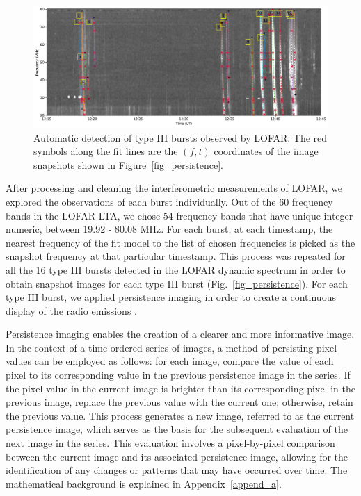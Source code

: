 \begin{figure}[ht]
\centering
\includegraphics[width=\hsize]{chapter3/figs/lofar_dyspec_detect__snapshot_coords.pdf}
\caption{Automatic detection of type III bursts observed by LOFAR. The red symbols along the fit lines are the $(f, t)$ coordinates of the image snapshots shown in Figure~\ref{fig_persistence}.}
\label{lofar_burst_detect}
\end{figure}

After processing and cleaning the interferometric measurements of LOFAR, we explored the observations of each burst individually.
Out of the 60 frequency bands in the LOFAR LTA, we chose 54 frequency bands that have unique integer numeric, between 19.92 - 80.08 MHz.
For each burst, at each timestamp, the nearest frequency of the fit model to the list of chosen frequencies is picked as the snapshot frequency at that particular timestamp.
This process was repeated for all the 16 type III bursts detected in the LOFAR dynamic spectrum in order to obtain snapshot images for each type III burst (Fig.~\ref{fig_persistence}).
For each type III burst, we applied persistence imaging in order to create a continuous display of the radio emissions \citep{thompson_2016}.

Persistence imaging enables the creation of a clearer and more informative image.
In the context of a time-ordered series of images, a method of persisting pixel values can be employed as follows: for each image, compare the value of each pixel to its corresponding value in the previous persistence image in the series. If the pixel value in the current image is brighter than its corresponding pixel in the previous image, replace the previous value with the current one; otherwise, retain the previous value. This process generates a new image, referred to as the current persistence image, which serves as the basis for the subsequent evaluation of the next image in the series. This evaluation involves a pixel-by-pixel comparison between the current image and its associated persistence image, allowing for the identification of any changes or patterns that may have occurred over time. The mathematical background is explained in Appendix~\ref{append_a}.

